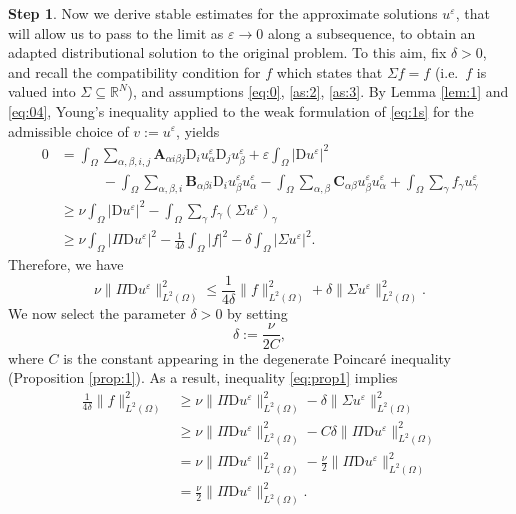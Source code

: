 \documentclass{amsart}
\numberwithin{equation}{section}
\numberwithin{thm}{section}
\theoremstyle{definition}
\newtheorem{proofpart}{Step}
\def\R{\mathbb{R}}
\renewcommand{\:}{\!:\!} %
\newcommand{\de}{\delta}
\newcommand{\e}{\varepsilon}
\newcommand{\sub}{\subseteq}
\renewcommand{\^}[1]{^{#1}_{\phantom{l}}}
\begin{document}
\begin{proofpart} Now we derive stable estimates for the approximate solutions $u^\e$, that will allow us to pass to the limit as $\e \to 0$ along a subsequence, to obtain an adapted distributional solution to the original problem. To this aim, fix $\delta > 0$, and recall the compatibility condition for $f$ which states that $\Sigma f = f$ (i.e.\ $f$ is valued into $\Sigma \sub \R^N$), and assumptions  \eqref{eq:0}, \eqref{as:2}, \eqref{as:3}. By Lemma \ref{lem:1} and \eqref{eq:04}, Young's inequality applied to the weak formulation of \eqref{eq:1s} for the admissible choice of $v:=u^\e$, yields
\[
\begin{split}
0 &= \int_{\Omega} \sum_{\alpha,\beta, i, j} \mathbf{A}_{\alpha i \beta j}\mathrm{D}_{i}u^{\varepsilon}_{\alpha}\mathrm{D}_{j}u^\varepsilon_{\beta} +\varepsilon \int_{\Omega} \lvert \mathrm{D}u^\varepsilon \rvert ^2  
\\
&\qquad\quad - \int_{\Omega}  \sum_{\alpha, \beta, i} \mathbf{B}_{\alpha \beta i}\mathrm{D}_{i}u^{\varepsilon}_{\beta}u^\varepsilon_{\alpha} - \int_{\Omega}  \sum_{\alpha, \beta} \mathbf{C}_{\alpha \beta}u^{\varepsilon}_{\beta}u^\varepsilon_{\alpha} + \int_{\Omega} \sum_{\gamma} f_{\gamma}u^\varepsilon_{\gamma} \nonumber 
\\ 
&\geq \nu \int_{\Omega} \lvert \mathrm{D}u^\varepsilon \rvert^2 - \int_{\Omega} \sum_{\gamma} f_{\gamma}(\Sigma u^\varepsilon)_{\gamma} \nonumber
 \\
  &\geq \nu \int_{\Omega} \lvert \Pi \mathrm{D}u^\varepsilon \rvert^2 -\frac{1}{4 \delta} \int_{\Omega} \lvert f \rvert^2 - \delta \int_{\Omega} \lvert \Sigma u^\varepsilon \rvert^2. \nonumber
\end{split}
\]
Therefore, we have
\begin{equation} \label{eq:prop1}
\nu  \| \Pi \mathrm{D}u^\varepsilon \| ^2_{L^2(\Omega)}  \leq \frac{1}{4 \delta } \| f \| ^2_{L^2(\Omega)} +   \de \| \Sigma u^\varepsilon \| ^2_{L^2(\Omega)}.
\end{equation}
We now select the parameter $\de>0$ by setting
\[
\delta := \frac{\nu}{2C}, 
\]
where $C$ is the constant appearing in the degenerate Poincar\'e inequality (Proposition \ref{prop:1}). As a result, inequality \eqref{eq:prop1} implies
\[
\begin{split}
\frac{1}{4 \delta} \| f \| ^2_{L^2(\Omega)} &\geq \nu \| \Pi \mathrm{D}u^\varepsilon \| ^2_{L^2(\Omega)} - \delta \| \Sigma u^\varepsilon \| ^2_{L^2(\Omega)} \\ &\geq \nu \| \Pi \mathrm{D}u^\varepsilon \| ^2_{L^2(\Omega)} - C\delta \| \Pi \mathrm{D}u^\varepsilon \| ^2_{L^2(\Omega)} \nonumber \\ &= \nu \| \Pi \mathrm{D}u^\varepsilon \| ^2_{L^2(\Omega)} - \frac{\nu}{2} \| \Pi \mathrm{D}u^\varepsilon \| ^2_{L^2(\Omega)} \nonumber \\ &= \frac{\nu}{2} \| \Pi \mathrm{D}u^\varepsilon \| ^2_{L^2(\Omega)} \nonumber.

\end{split}\]
\end{proofpart}
\end{document}

